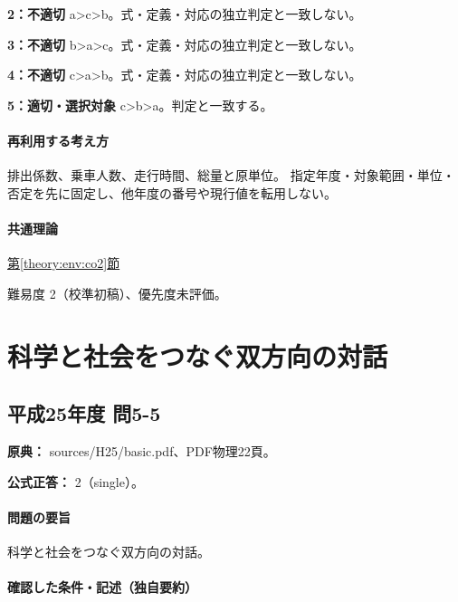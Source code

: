 \noindent\textbf{2：不適切} a>c>b。式・定義・対応の独立判定と一致しない。\par

\noindent\textbf{3：不適切} b>a>c。式・定義・対応の独立判定と一致しない。\par

\noindent\textbf{4：不適切} c>a>b。式・定義・対応の独立判定と一致しない。\par

\noindent\textbf{5：適切・選択対象} c>b>a。判定と一致する。\par

\paragraph{再利用する考え方} 排出係数、乗車人数、走行時間、総量と原単位。 指定年度・対象範囲・単位・否定を先に固定し、他年度の番号や現行値を転用しない。

\paragraph{共通理論} \hyperref[theory:env:co2]{第\ref*{theory:env:co2}節}

\par 難易度 2（校準初稿）、優先度未評価。

\section{科学と社会をつなぐ双方向の対話}

\subsection{平成25年度 問5-5}
\label{q:h25-reg-basic-5-5}

\noindent\textbf{原典：} sources/H25/basic.pdf、PDF物理22頁。

\textbf{公式正答：} 2（single）。

\paragraph{問題の要旨} 科学と社会をつなぐ双方向の対話。

\paragraph{確認した条件・記述（独自要約）}\mbox{}\par

